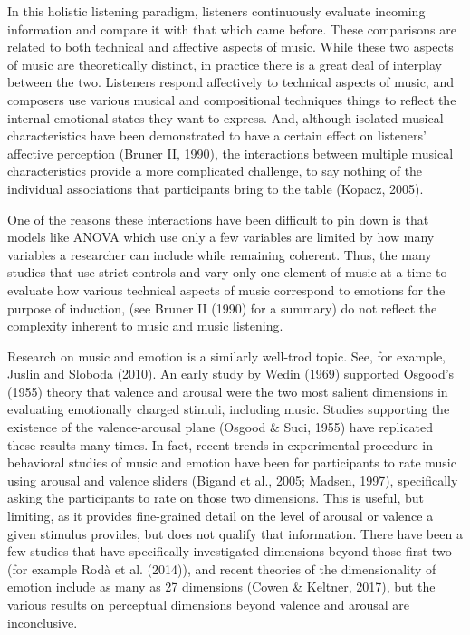 \documentclass[
  english,
  man,floatsintext]{apa6}
\begin{document}
In this holistic listening paradigm, listeners continuously evaluate incoming information and compare it with that which came before. These comparisons are related to both technical and affective aspects of music. While these two aspects of music are theoretically distinct, in practice there is a great deal of interplay between the two. Listeners respond affectively to technical aspects of music, and composers use various musical and compositional techniques things to reflect the internal emotional states they want to express. And, although isolated musical characteristics have been demonstrated to have a certain effect on listeners' affective perception (Bruner II, 1990), the interactions between multiple musical characteristics provide a more complicated challenge, to say nothing of the individual associations that participants bring to the table (Kopacz, 2005).

One of the reasons these interactions have been difficult to pin down is that models like ANOVA which use only a few variables are limited by how many variables a researcher can include while remaining coherent. Thus, the many studies that use strict controls and vary only one element of music at a time to evaluate how various technical aspects of music correspond to emotions for the purpose of induction, (see Bruner II (1990) for a summary) do not reflect the complexity inherent to music and music listening.

Research on music and emotion is a similarly well-trod topic. See, for example, Juslin and Sloboda (2010). An early study by Wedin (1969) supported Osgood's (1955) theory that valence and arousal were the two most salient dimensions in evaluating emotionally charged stimuli, including music. Studies supporting the existence of the valence-arousal plane (Osgood \& Suci, 1955) have replicated these results many times. In fact, recent trends in experimental procedure in behavioral studies of music and emotion have been for participants to rate music using arousal and valence sliders (Bigand et al., 2005; Madsen, 1997), specifically asking the participants to rate on those two dimensions. This is useful, but limiting, as it provides fine-grained detail on the level of arousal or valence a given stimulus provides, but does not qualify that information. There have been a few studies that have specifically investigated dimensions beyond those first two (for example Rodà et al. (2014)), and recent theories of the dimensionality of emotion include as many as 27 dimensions (Cowen \& Keltner, 2017), but the various results on perceptual dimensions beyond valence and arousal are inconclusive.
\end{document}
